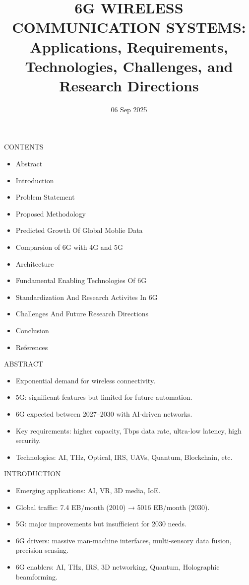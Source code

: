 \documentclass{beamer}
\institute{Kakatiya Insitute of technology and sciences}
\title[6G Wireless Communication]{6G WIRELESS COMMUNICATION SYSTEMS: Applications, Requirements, Technologies, Challenges, and Research Directions}
\date{06 Sep 2025}
\begin{document}
\begin{frame}
  \titlepage
\end{frame}
\begin{frame}{CONTENTS}
   \begin{itemize}
       \item Abstract
       \item Introduction
       \item Problem Statement
       \item Proposed Methodology
       \item Predicted Growth Of Global Moblie Data
       \item Comparsion of 6G with 4G and 5G
       \item Architecture 
       \item Fundamental Enabling Technologies Of 6G
       \item Standardization And Research Activites In 6G
       \item Challenges And Future Research Directions
       \item Conclusion
       \item References
   \end{itemize}
 \end{frame}


\begin{frame}{ABSTRACT}
  \begin{itemize}
    \item Exponential demand for wireless connectivity.  
    \item 5G: significant features but limited for future automation.  
    \item 6G expected between 2027--2030 with AI-driven networks.  
    \item Key requirements: higher capacity, Tbps data rate, ultra-low latency, high security.  
    \item Technologies: AI, THz, Optical, IRS, UAVs, Quantum, Blockchain, etc.  
  \end{itemize}
\end{frame}


\begin{frame}{INTRODUCTION}
  \begin{itemize}
    \item Emerging applications: AI, VR, 3D media, IoE.  
    \item Global traffic: 7.4 EB/month (2010) → 5016 EB/month (2030).  
    \item 5G: major improvements but insufficient for 2030 needs.  
    \item 6G drivers: massive man-machine interfaces, multi-sensory data fusion, precision sensing.  
    \item 6G enablers: AI, THz, IRS, 3D networking, Quantum, Holographic beamforming.  
  \end{itemize}
\end{frame}
\end{document}
